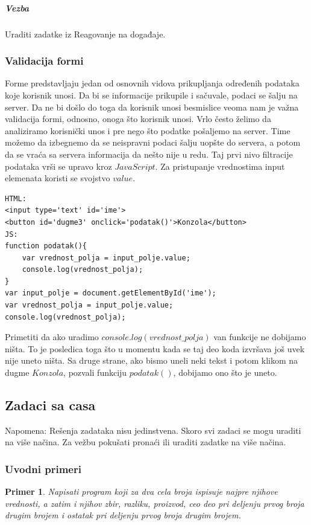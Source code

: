 \documentclass[a4paper]{article}
\newtheorem{primer}{Primer}[section]
\begin{document}
\subparagraph{Vezba} Uraditi zadatke iz Reagovanje na događaje.

\subsubsection{Validacija formi}
Forme predstavljaju jedan od osnovnih vidova prikupljanja određenih podataka koje korisnik unosi. Da bi se informacije prikupile i sačuvale, podaci se šalju na server. Da ne bi došlo do toga da korisnik unosi besmislice veoma nam je važna validacija formi, odnosno, onoga što korisnik unosi.
Vrlo često želimo da analiziramo korisnički unos i pre nego što podatke pošaljemo na server. Time možemo da izbegnemo da se neispravni podaci šalju uopšte do servera, a potom da se vraća sa servera informacija da nešto nije u redu. Taj prvi nivo filtracije podataka vrši se upravo kroz $JavaScript$. Za pristupanje vrednostima input elemenata koristi se svojstvo $value$.
\begin{lstlisting}[backgroundcolor = \color{lightgray}]
HTML:
<input type='text' id='ime'>
<button id='dugme3' onclick='podatak()'>Konzola</button>
JS:
function podatak(){
	var vrednost_polja = input_polje.value;
	console.log(vrednost_polja);    
}
var input_polje = document.getElementById('ime');
var vrednost_polja = input_polje.value;
console.log(vrednost_polja);
\end{lstlisting}
Primetiti da ako uradimo $console.log(vrednost\_polja)$ van funkcije ne dobijamo ništa. To je posledica toga što u momentu kada se taj deo koda izvršava još uvek nije uneto ništa. Sa druge strane, ako bismo uneli neki tekst i potom klikom na dugme $Konzola$, pozvali funkciju $podatak()$, dobijamo ono što je uneto.
 
\newpage
\subsection{Zadaci sa casa}
Napomena: Rešenja zadataka nisu jedinstvena. Skoro svi zadaci se mogu uraditi na više načina. Za vežbu pokušati pronaći ili uraditi zadatke na više načina. 
\subsubsection{Uvodni primeri}

\begin{primer}
Napisati program koji za dva cela broja ispisuje najpre
njihove vrednosti, a zatim i njihov zbir, razliku, proizvod, ceo deo pri deljenju
prvog broja drugim brojem i ostatak pri deljenju prvog broja drugim brojem. 
\end{primer}
\end{document}
